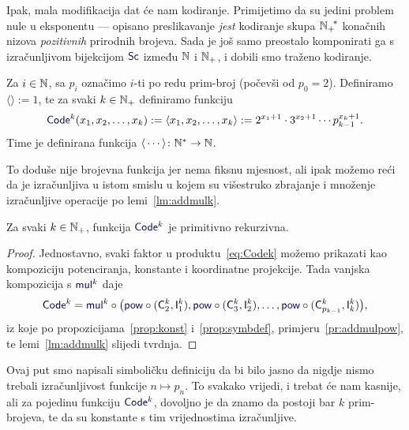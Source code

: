 Ipak, mala modifikacija dat će nam kodiranje. Primijetimo da su jedini problem nule u eksponentu --- opisano preslikavanje \emph{jest} kodiranje skupa ${{\mathbb N}_+\!}^*$ konačnih nizova \emph{pozitivnih} prirodnih brojeva. Sada je još samo preostalo komponirati ga s izračunljivom bijekcijom $\f{Sc}$ između ${\mathbb N}$ i ${\mathbb N}_+$, i dobili smo traženo kodiranje.

\begin{definicija}
Za $i\in{\mathbb N}$, sa $p_i$ označimo $i$-ti po redu prim-broj (počevši od $p_0=2$). Definiramo $\langle\rangle:=1$, te za svaki $k\in{\mathbb N}_+$ definiramo funkciju
\begin{equation}\label{eq:Codek}
    \f{Code}^k(x_1,x_2,\dotsc,x_k):=\langle x_1,x_2,\dotsc,x_k\rangle:=2^{x_1+1}\cdot3^{x_2+1}\dotsm p_{k-1}^{x_k+1}\text.
\end{equation}
Time je definirana funkcija $\langle\,\cdots\rangle\colon{\mathbb N}^*\to{\mathbb N}$.
\end{definicija}

To doduše nije brojevna funkcija jer nema fiksnu mjesnost, ali ipak možemo reći da je izračunljiva u istom smislu u kojem su višestruko zbrajanje i množenje izračunljive operacije po lemi~\ref{lm:addmulk}.

\begin{propozicija}\label{prop:Codekprn}
Za svaki $k\in{\mathbb N}_+$, funkcija $\f{Code}^k$ je primitivno rekurzivna.
\end{propozicija}
\begin{proof}
    Jednostavno, svaki faktor u produktu~\eqref{eq:Codek} možemo prikazati kao kompoziciju potenciranja, konstante i koordinatne projekcije. Tada vanjska kompozicija s $\f{mul}^k$ daje%
    \begin{equation}\f{Code}^k=\f{mul}^k\circ\bigl(\f{pow}\circ(\f C_2^k,\f I_1^k),\f{pow}\circ(\f C_3^k,\f I_2^k),\dotsc,\f{pow}\circ(\f C_{p_{k-1}}^k,\f I_k^k)\bigr)\text,
    \end{equation}
    iz koje po propozicijama~\ref{prop:konst} i~\ref{prop:symbdef}, primjeru~\ref{pr:addmulpow}, te lemi~\ref{lm:addmulk} slijedi tvrdnja.
\end{proof}

Ovaj put smo napisali simboličku definiciju da bi bilo jasno da nigdje nismo trebali izračunljivost funkcije $n\mapsto p_n$. To svakako vrijedi, i trebat će nam kasnije, ali za pojedinu funkciju $\f{Code}^k$, dovoljno je da znamo da postoji bar $k$ prim-brojeva, te da su konstante s tim vrijednostima izračunljive.

